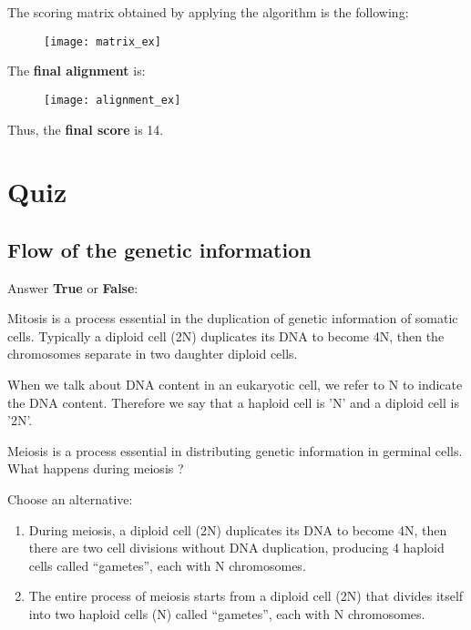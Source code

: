 \begin{Answer} [
  ref={exSW},
  number={4}
 ]
 
 The scoring matrix obtained by applying the algorithm is the following: 

 \begin{figure}[H]
  \centering
  \texttt{[image: matrix\_ex]}
 \end{figure}

 The \textbf{final alignment} is:

 \begin{figure}[H]
  \centering
  \texttt{[image: alignment\_ex]}
 \end{figure}

 Thus, the \textbf{final score} is 14.

\end{Answer}

\section{Quiz}

\subsection{Flow of the genetic information}

\begin{Exercise} [
  title={Mitosis},
  difficulty={1},
  label={ex7},
  origin={G. Valle}
 ]

Answer \textbf{True} or \textbf{False}:

  \Question Mitosis is a process essential in the duplication of genetic
information of somatic cells.
Typically a diploid cell (2N) duplicates its DNA to become 4N, then the
chromosomes separate in two daughter diploid cells.

\end{Exercise}

\begin{Exercise} [
  title={Meiosis},
  difficulty={1},
  label={ex8},
  origin={G. Valle}
 ]

  \Question When we talk about DNA content in an eukaryotic cell, we refer to
N to indicate the DNA content.
Therefore we say that a haploid cell is 'N' and a diploid cell is '2N'.

Meiosis is a process essential in distributing genetic information in germinal
cells. What happens during  meiosis ?

Choose an alternative:

\begin{enumerate}
  \item During meiosis,  a diploid cell (2N) duplicates its DNA to become 4N,
then there are two cell divisions without DNA duplication, producing 4 haploid
cells called “gametes”, each with N chromosomes.
  \item The entire process of meiosis starts from a diploid cell (2N) that
divides itself into two haploid cells (N) called “gametes”, each with N
chromosomes.
\end{enumerate}

\end{Exercise}

